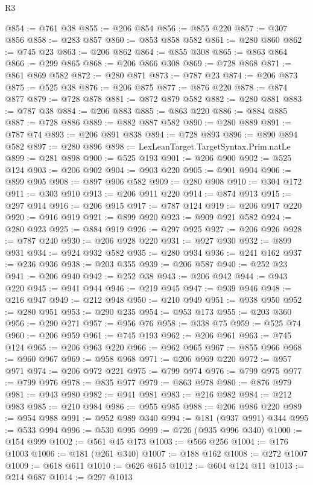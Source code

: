 \begin{lexlean}{R3}
\begin{coremodule}
@854 := @761 @38
@855 := @206 @854
@856 := @855 @220
@857 := @307 @856
@858 := @283 @857
@860 := @853 @858 @582
@861 := @280 @860
@862 := @745 @23
@863 := @206 @862
@864 := @855 @308
@865 := @863 @864
@866 := @299 @865
@868 := @206 @866 @308
@869 := @728 @868
@871 := @861 @869 @582
@872 := @280 @871
@873 := @787 @23
@874 := @206 @873
@875 := @525 @38
@876 := @206 @875
@877 := @876 @220
@878 := @874 @877
@879 := @728 @878
@881 := @872 @879 @582
@882 := @280 @881
@883 := @787 @38
@884 := @206 @883
@885 := @863 @220
@886 := @884 @885
@887 := @728 @886
@889 := @882 @887 @582
@890 := @280 @889
@891 := @787 @74
@893 := @206 @891 @838
@894 := @728 @893
@896 := @890 @894 @582
@897 := @280 @896
@898 := LexLeanTarget.TargetSyntax.Prim.natLe
@899 := @281 @898
@900 := @525 @193
@901 := @206 @900
@902 := @525 @124
@903 := @206 @902
@904 := @903 @220
@905 := @901 @904
@906 := @899 @905
@908 := @897 @906 @582
@909 := @280 @908
@910 := @304 @172
@911 := @303 @910
@913 := @206 @911 @220
@914 := @874 @913
@915 := @297 @914
@916 := @206 @915
@917 := @787 @124
@919 := @206 @917 @220
@920 := @916 @919
@921 := @899 @920
@923 := @909 @921 @582
@924 := @280 @923
@925 := @884 @919
@926 := @297 @925
@927 := @206 @926
@928 := @787 @240
@930 := @206 @928 @220
@931 := @927 @930
@932 := @899 @931
@934 := @924 @932 @582
@935 := @280 @934
@936 := @241 @162
@937 := @236 @936
@938 := @203 @355
@939 := @206 @587
@940 := @252 @23
@941 := @206 @940
@942 := @252 @38
@943 := @206 @942
@944 := @943 @220
@945 := @941 @944
@946 := @219 @945
@947 := @939 @946
@948 := @216 @947
@949 := @212 @948
@950 := @210 @949
@951 := @938 @950
@952 := @280 @951
@953 := @290 @235
@954 := @953 @173
@955 := @203 @360
@956 := @290 @271
@957 := @956 @76
@958 := @338 @75
@959 := @525 @74
@960 := @206 @959
@961 := @745 @193
@962 := @206 @961
@963 := @745 @124
@965 := @206 @963 @220
@966 := @962 @965
@967 := @855 @966
@968 := @960 @967
@969 := @958 @968
@971 := @206 @969 @220
@972 := @957 @971
@974 := @206 @972 @221
@975 := @799 @974
@976 := @799 @975
@977 := @799 @976
@978 := @835 @977
@979 := @863 @978
@980 := @876 @979
@981 := @943 @980
@982 := @941 @981
@983 := @216 @982
@984 := @212 @983
@985 := @210 @984
@986 := @955 @985
@988 := @206 @986 @220
@989 := @954 @988
@991 := @952 @989 @340
@994 := @181 (@937 @991) @344
@995 := @533 @994
@996 := @530 @995
@999 := @726 (@935 @996 @340)
@1000 := @154 @999
@1002 := @561 @45 @173
@1003 := @566 @256
@1004 := @176 @1003
@1006 := @181 (@261 @340)
@1007 := @188 @162
@1008 := @272 @1007
@1009 := @618 @611
@1010 := @626 @615
@1012 := @604 @124 @11
@1013 := @214 @687
@1014 := @297 @1013

\end{coremodule}
\end{lexlean}
